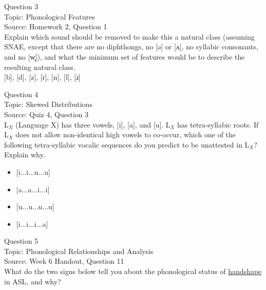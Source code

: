 \documentclass[12pt]{article}
\begin{document}
{\large Question 3}\\

Topic: Phonological Features\\
Source: Homework 2, Question 1\\

Explain which sound should be removed to make this a natural class (assuming SNAE, except that there are no diphthongs, no [ə] or [ʌ], no syllabic consonants, and no [w̥]), and what the minimum set of features would be to describe the resulting natural class.\\

{[b]}, {[d]}, {[z]}, {[ɾ]}, {[n]}, {[l]}, {[ɹ]}


\newpage

{\large Question 4}\\

Topic: Skewed Distributions\\
Source: Quiz 4, Question 3\\

L$_X$ (Language X) has three vowels, [i], [a], and [u]. L$_X$ has tetra-syllabic roots. If L$_X$ does not allow non-identical high vowels to co-occur, which one of the following tetra-syllabic vocalic sequences do you predict to be unattested in L$_X$? Explain why.\\

\begin{itemize} \item {[i...i...u...u]} \item {[a...a...i...i]} \item {[u...u...u...u]} \item {[i...i...i...a]} \end{itemize}


\newpage

{\large Question 5}\\

Topic: Phonological Relationships and Analysis\\
Source: Week 6 Handout, Question 11\\

What do the two signs below tell you about the phonological status of \underline{handshape} in ASL, and why?\\
\end{document}
